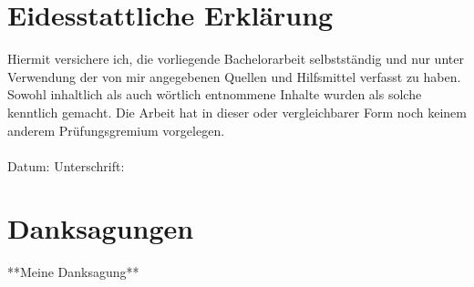 \pagestyle{empty}
\setcounter{secnumdepth}{0}
\section{Eidesstattliche Erklärung}

Hiermit versichere ich, die vorliegende Bachelorarbeit selbstständig und nur unter Verwendung der von mir angegebenen Quellen und Hilfsmittel verfasst zu haben. Sowohl inhaltlich als auch wörtlich entnommene Inhalte wurden als solche kenntlich gemacht. Die Arbeit hat in dieser oder vergleichbarer Form noch keinem anderem Prüfungsgremium vorgelegen. \\
\\[1.5cm]
Datum:	\hrulefill\enspace Unterschrift: \hrulefill
\\[3.5cm]

\newpage
\section{Danksagungen}
**Meine Danksagung**
